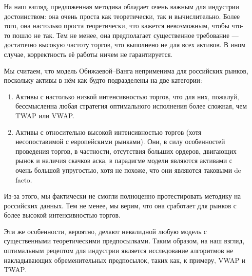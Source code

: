 \conclusion %


На наш взгляд, предложенная методика обладает очень важным для индустрии достоинством: 
она очень проста как теоретически, так и вычислительно. Более того, она настолько проста теоретически,
что кажется невозможным, чтобы что-то пошло не так. Тем не менее, она предполагает существенное требование ---
достаточно высокую частоту торгов, что выполнено не для всех активов. В ином случае, корректность её работы
ничем не гарантируется. 
\par
Мы считаем, что модель Обижаевой--Ванга неприменима для российских рынков, поскольку активы в нём как будто
подразделены на две категории:

\begin{enumerate}
    \item Активы с настолько низкой интенсивностью торгов, что для них, пожалуй, бессмысленна любая
    стратегия оптимального исполнения более сложная, чем TWAP или VWAP.
    \item Активы с относительно высокой интенсивностью торгов (хотя несопоставимой с европейскими рынками).
    Они, в силу особенностей проведения торгов, в частности, отсутствия больших ордеров, двигающих рынок 
    и наличия скачков аска, в парадигме модели являются активами с очень большой упругостью, хотя не похоже,
    что они являются таковыми de facto.
\end{enumerate}
Из-за этого, мы фактически не смогли полноценно протестировать методику на российских данных. Тем не менее, 
мы верим, что она сработает для рынков с более высокой интенсивностью торгов. \par
Эти же особенности, вероятно, делают невалидной любую модель с существенными теоретическими предпосылками.
Таким образом, на наш взгляд, оптимальным рецептом для индустрии является исследование алгоритмов не накладывающих
обременительных предпосылок, таких как, к примеру, VWAP и TWAP.